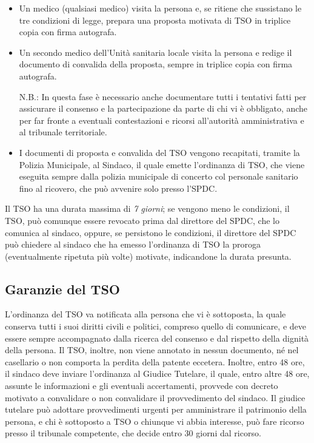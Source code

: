 \begin{itemize}
\item
  Un medico (qualsiasi medico) visita la persona e, se ritiene che
  sussistano le tre condizioni di legge, prepara una proposta motivata
  di TSO in triplice copia con firma autografa.
\item
  Un secondo medico dell'Unità sanitaria locale visita la persona e
  redige il documento di convalida della proposta, sempre in triplice
  copia con firma autografa.
  
N.B.: In questa fase è necessario anche documentare tutti i tentativi
fatti per assicurare il consenso e la partecipazione da parte di chi vi
è obbligato, anche per far fronte a eventuali contestazioni e ricorsi
all'autorità amministrativa e al tribunale territoriale.

\item
  I documenti di proposta e convalida del TSO vengono recapitati,
  tramite la Polizia Municipale, al Sindaco, il quale emette l'ordinanza
  di TSO, che viene eseguita sempre dalla polizia municipale di concerto
  col personale sanitario fino al ricovero, che può avvenire solo presso
  l'SPDC.
\end{itemize}

Il TSO ha una durata massima di \emph{7 giorni}; se vengono meno le
condizioni, il TSO, può comunque essere revocato prima dal direttore del
SPDC, che lo comunica al sindaco, oppure, se persistono le condizioni,
il direttore del SPDC può chiedere al sindaco che ha emesso l'ordinanza
di TSO la proroga (eventualmente ripetuta più volte) motivate,
indicandone la durata presunta.

\subsection{Garanzie del TSO}

L'ordinanza del TSO va notificata alla persona che vi è sottoposta, la
quale conserva tutti i suoi diritti civili e politici, compreso quello
di comunicare, e deve essere sempre accompagnato dalla ricerca del
consenso e dal rispetto della dignità della persona. Il TSO, inoltre,
non viene annotato in nessun documento, né nel casellario o non comporta
la perdita della patente eccetera. Inoltre, entro 48 ore, il sindaco
deve inviare l'ordinanza al Giudice Tutelare, il quale, entro altre 48
ore, assunte le informazioni e gli eventuali accertamenti, provvede con
decreto motivato a convalidare o non convalidare il provvedimento del
sindaco. Il giudice tutelare può adottare provvedimenti urgenti per
amministrare il patrimonio della persona, e chi è sottoposto a TSO o
chiunque vi abbia interesse, può fare ricorso presso il tribunale
competente, che decide entro 30 giorni dal ricorso.

